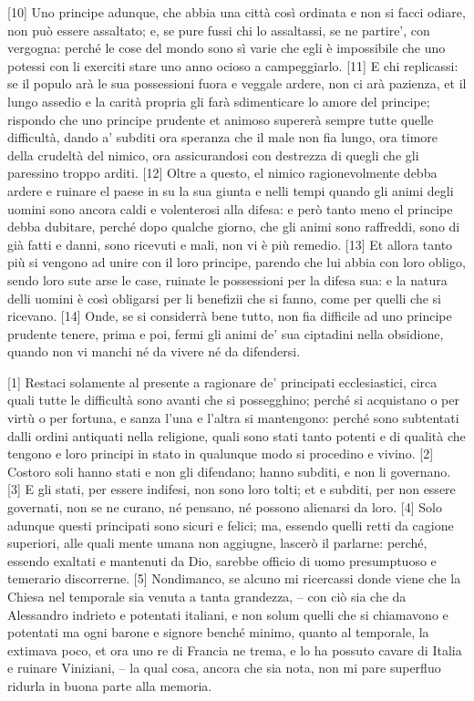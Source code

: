 {[}10{]} Uno principe adunque, che abbia una città così ordinata e non
si facci odiare, non può essere assaltato; e, se pure fussi chi lo
assaltassi, se ne partire', con vergogna: perché le cose del mondo sono
sì varie che egli è impossibile che uno potessi con li exerciti stare
uno anno ocioso a campeggiarlo. {[}11{]} E chi replicassi: se il populo
arà le sua possessioni fuora e veggale ardere, non ci arà pazienza, et
il lungo assedio e la carità propria gli farà sdimenticare lo amore del
principe; rispondo che uno principe prudente et animoso supererà sempre
tutte quelle difficultà, dando a' subditi ora speranza che il male non
fia lungo, ora timore della crudeltà del nimico, ora assicurandosi con
destrezza di quegli che gli paressino troppo arditi. {[}12{]} Oltre a
questo, el nimico ragionevolmente debba ardere e ruinare el paese in su
la sua giunta e nelli tempi quando gli animi degli uomini sono ancora
caldi e volenterosi alla difesa: e però tanto meno el principe debba
dubitare, perché dopo qualche giorno, che gli animi sono raffreddi, sono
di già fatti e danni, sono ricevuti e mali, non vi è più remedio.
{[}13{]} Et allora tanto più si vengono ad unire con il loro principe,
parendo che lui abbia con loro obligo, sendo loro sute arse le case,
ruinate le possessioni per la difesa sua: e la natura delli uomini è
così obligarsi per li benefizii che si fanno, come per quelli che si
ricevano. {[}14{]} Onde, se si considerrà bene tutto, non fia difficile
ad uno principe prudente tenere, prima e poi, fermi gli animi de' sua
ciptadini nella obsidione, quando non vi manchi né da vivere né da
difendersi.


{[}1{]} Restaci solamente al presente a ragionare de' principati
ecclesiastici, circa quali tutte le difficultà sono avanti che si
possegghino; perché si acquistano o per virtù o per fortuna, e sanza
l'una e l'altra si mantengono: perché sono subtentati dalli ordini
antiquati nella religione, quali sono stati tanto potenti e di qualità
che tengono e loro principi in stato in qualunque modo si procedino e
vivino. {[}2{]} Costoro soli hanno stati e non gli difendano; hanno
subditi, e non li governano. {[}3{]} E gli stati, per essere indifesi,
non sono loro tolti; et e subditi, per non essere governati, non se ne
curano, né pensano, né possono alienarsi da loro. {[}4{]} Solo adunque
questi principati sono sicuri e felici; ma, essendo quelli retti da
cagione superiori, alle quali mente umana non aggiugne, lascerò il
parlarne: perché, essendo exaltati e mantenuti da Dio, sarebbe officio
di uomo presumptuoso e temerario discorrerne. {[}5{]} Nondimanco, se
alcuno mi ricercassi donde viene che la Chiesa nel temporale sia venuta
a tanta grandezza, -- con ciò sia che da Alessandro indrieto e potentati
italiani, e non solum quelli che si chiamavono e potentati ma ogni
barone e signore benché minimo, quanto al temporale, la extimava poco,
et ora uno re di Francia ne trema, e lo ha possuto cavare di Italia e
ruinare Viniziani, -- la qual cosa, ancora che sia nota, non mi pare
superfluo ridurla in buona parte alla memoria.

